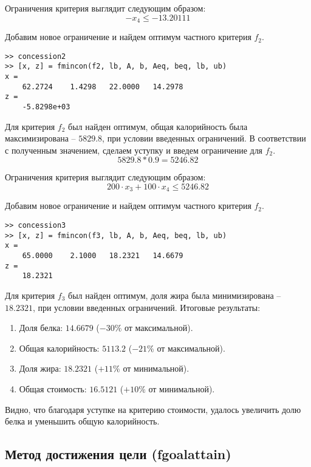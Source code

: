Ограничения критерия выглядит следующим образом:
$$
-x_4 \leq -13.20111
$$

Добавим новое ограничение и найдем оптимум частного критерия $f_2$.



\begin{lstlisting}[caption=\code{Console}]
>> concession2
>> [x, z] = fmincon(f2, lb, A, b, Aeq, beq, lb, ub)
x =
	62.2724    1.4298   22.0000   14.2978
z =
	-5.8298e+03
\end{lstlisting}

Для критерия $f_2$ был найден оптимум, общая калорийность была максимизирована -- $5829.8$, при условии введенных ограничений. В соответствии с полученным значением, сделаем уступку и введем ограничение для $f_2$.
$$
5829.8 * 0.9 = 5246.82
$$

Ограничения критерия выглядит следующим образом:
$$
200 \cdot x_3 + 100 \cdot x_4 \leq 5246.82
$$

Добавим новое ограничение и найдем оптимум частного критерия $f_2$.



\begin{lstlisting}[caption=\code{Console}]
>> concession3
>> [x, z] = fmincon(f3, lb, A, b, Aeq, beq, lb, ub)
x =
	65.0000    2.1000   18.2321   14.6679
z =
	18.2321
\end{lstlisting}

Для критерия $f_3$ был найден оптимум, доля жира была минимизирована -- $18.2321$, при условии введенных ограничений. Итоговые результаты:

\begin{enumerate}
	\item Доля белка: $14.6679$ ($-30\%$ от максимальной).
	\item Общая калорийность: $5113.2$ ($-21\%$ от максимальной).
	\item Доля жира: $18.2321$ ($+11\%$ от минимальной).
	\item Общая стоимость: $16.5121$ ($+10\%$ от минимальной).
\end{enumerate}

Видно, что благодаря уступке на критерию стоимости, удалось увеличить долю белка и уменьшить общую калорийность.

\subsection{Метод достижения цели (fgoalattain)}

